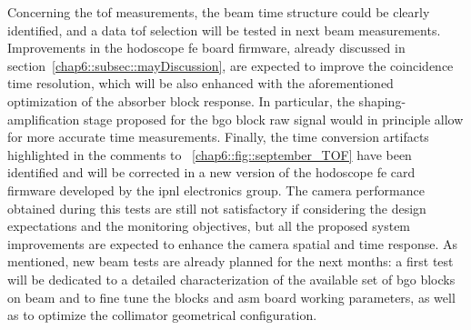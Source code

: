 Concerning the \gls{tof} measurements, the beam time structure could be clearly identified, and a data \gls{tof} selection will be tested in next beam measurements. Improvements in the hodoscope \gls{fe} board firmware, already discussed in section~\ref{chap6::subsec::mayDiscussion}, are expected to improve the coincidence time resolution, which will be also enhanced with the aforementioned optimization of the absorber block response. In particular, the shaping-amplification stage proposed for the \gls{bgo} block raw signal would in principle allow for more accurate time measurements. Finally, the time conversion artifacts highlighted in the comments to \figurename~\ref{chap6::fig::september_TOF} have been identified and will be corrected in a new version of the hodoscope \gls{fe} card firmware developed by the \gls{ipnl} electronics group.
The camera performance obtained during this tests are still not satisfactory if considering the design expectations and the monitoring objectives, but all the proposed system improvements are expected to enhance the camera spatial and time response. As mentioned, new beam tests are already planned for the next months: a first test will be dedicated to a detailed characterization of the available set of \gls{bgo} blocks on beam and to fine tune the blocks and \gls{asm} board working parameters, as well as to optimize the collimator geometrical configuration.
  


\clearpage
